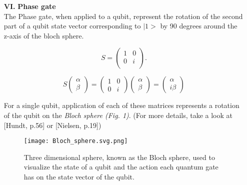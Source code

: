 \documentclass[onecolumn,10pt,cleanfoot]{asme2ej}
\begin{document}
\begin{enumerate}
	\item[\textbf{VI.}] \textbf{Phase gate} \\
		The Phase gate, when applied to a qubit, represent the rotation of the second part of a qubit state vector corresponding to $|1>$ by 90 degrees around the z-axis of the bloch sphere.

		\begin{equation*}
			S = \begin{pmatrix}
			1 & 0 \\
			0 & i \\
		\end{pmatrix}.
	\end{equation*}

	\begin{equation*}
		S \begin{pmatrix}
		\alpha \\
		\beta
		\end{pmatrix}
		=
		\begin{pmatrix}
		1 & 0 \\
		0 & i
		\end{pmatrix}
		\begin{pmatrix}
		\alpha \\
		\beta
		\end{pmatrix}
		=
		\begin{pmatrix}
		\alpha \\
		i\beta
		\end{pmatrix}
	\end{equation*}


	For a single qubit, application of each of these matrices represents a rotation of the qubit on the \textit{Bloch sphere (Fig. 1)}. (For more details, take a look at [Hundt, p.56] or [Nielsen, p.19])

\begin{figure}[H]
  \centering
  \texttt{[image: Bloch\_sphere.svg.png]}
  \caption{Three dimensional sphere, known as the Bloch sphere, used to visualize the state of a qubit and the action each quantum gate has on the state vector of the qubit.}
  \label{fig:example}
\end{figure}


\end{enumerate}
\end{document}
